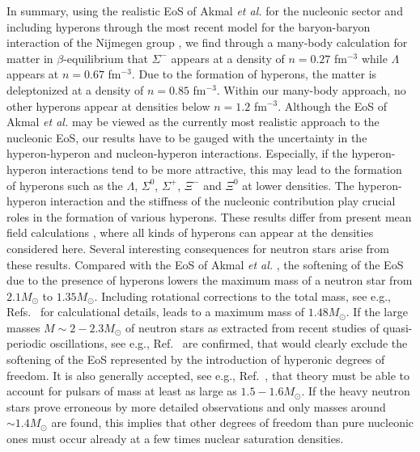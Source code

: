 In summary, using the realistic EoS of Akmal {\em et al.} \cite{apr98} for the 
nucleonic sector and including hyperons through the most recent model for the 
baryon-baryon interaction of the Nijmegen group \cite{sr99}, we find 
through a many-body calculation for matter in $\beta$-equilibrium that
$\Sigma^-$ appears at a density of $n=0.27$ fm$^{-3}$ while 
$\Lambda$ appears at $n=0.67$ fm$^{-3}$. 
Due to the formation
of hyperons, the matter is deleptonized 
at a density of $n=0.85$ fm$^{-3}$. Within our many-body approach,
no other hyperons appear at densities below $n=1.2$ fm$^{-3}$.  
Although the EoS of Akmal {\em et al.} \cite{apr98} may be viewed as the currently 
most realistic approach to the nucleonic EoS, our
results have to be gauged with the uncertainty in the hyperon-hyperon and nucleon-hyperon
interactions. Especially, if the hyperon-hyperon interactions tend to be 
more attractive, this may lead to the formation of hyperons such as the $\Lambda$, 
$\Sigma^0$, $\Sigma^+$, $\Xi^-$ and $\Xi^0$ at lower densities.
The hyperon-hyperon interaction and the stiffness of the nucleonic contribution
play crucial roles in the formation of various hyperons. These results differ 
from present mean field calculations \cite{glen97,prakash97,pke95,ms96},
where all kinds of hyperons can appear at the densities considered here.
Several interesting consequences for neutron stars arise from these results. 
Compared with the EoS of Akmal {\em et al.} \cite{apr98}, the softening
of the EoS due to the presence of hyperons lowers the maximum mass of a neutron 
star from $2.1M_{\odot}$ to $1.35M_{\odot}$. Including rotational corrections to the 
total mass, see e.g., Refs.\ 
\cite{glen97,hh99,hartle67} for calculational details, 
leads to a maximum mass of  $1.48M_{\odot}$. If the large masses $M\sim 2-2.3M_{\odot}$
of neutron stars as extracted
from recent studies of quasi-periodic oscillations, see e.g., Ref.\ \cite{Lamb}
are confirmed, that would clearly exclude the softening of the EoS represented
by the introduction of hyperonic degrees of freedom.  It is also
generally accepted, see e.g., Ref.\ \cite{glen97}, that
theory must be able to account for pulsars of mass at least as large as
$1.5-1.6M_{\odot}$.
If the heavy neutron stars prove erroneous by more detailed observations
and only masses around $\sim 1.4M_\odot$ \cite{thorsett} are found, 
this implies that other degrees of freedom than pure nucleonic ones 
must occur already at a few times nuclear
saturation densities. 

